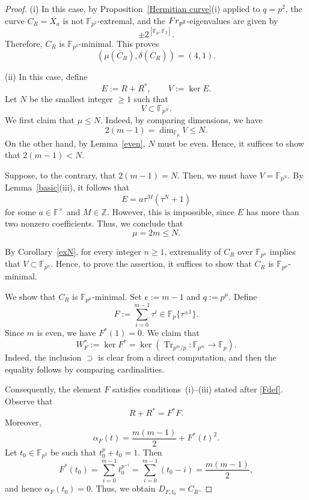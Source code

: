 \documentclass[10pt,a4paper]{amsart}
\def\F{{\mathbb F}}
\DeclareMathOperator{\Tr}{Tr}
\def\Z{{\mathbb Z}}
\begin{document}
\begin{proof}
(i) In this case, by Proposition~\ref{Hermitian curve}(i) applied to $q=p^2$, the curve $C_R=X_a$ is not $\F_{p^2}$-extremal, and the ${\rm Fr}_{p^2}$-eigenvalues are given by 
\[
\pm 2^{[\F_{p}:\F_2]}. 
\]
Therefore, $C_R$ is $\F_{p^4}$-minimal. This proves 
\[
(\mu(\overline{C}_R),\delta(\overline{C}_R))=(4,1). 
\]

\medskip

\noindent
(ii) In this case, define 
\[
E:=R+R^\ast,\qquad V:=\ker E. 
\]
Let $N$ be the smallest integer $\geq1$ such that 
\[
V\subset \F_{p^N}. 
\]
We first claim that $\mu\leq N$. Indeed, by comparing dimensions, we have 
\[
2(m-1)=\dim_{\F_p}
V\leq N.\]
On the other hand, by Lemma~\ref{even}, $N$ must be even. Hence, it suffices to show that $2(m-1)<N$. 

Suppose, to the contrary, that $2(m-1)=N$. Then, we must have $V=\F_{p^N}$. By Lemma~\ref{basic}(iii), it follows that 
\[
E=a\tau^M(\tau^N+1)
\]
for some $a\in \F^\times$ and $M\in\Z$. However, this is impossible, since $E$ has more than two nonzero coefficients. 
Thus, we conclude that 
\[\mu=2m\leq N. \]

By Corollary~\ref{exN}, for every integer $n\geq1$, extremality of $C_R$ over $\F_{p^n}$ implies that $V\subset \F_{p^n}$. Hence, to prove the assertion, it suffices to show that $C_R$ is $\F_{p^\mu}$-minimal. 

\medskip 

We show that $C_R$ is $\F_{p^\mu}$-minimal. Set $e:=m-1$ and $q:=p^\mu$. Define 
    \[
    F:=\sum_{i=0}^{m-1}\tau^i\in\F_p\{\tau^{\pm1}\}. 
    \]
    Since $m$ is even, we have $F^\ast(1)=0$. We claim that 
    \begin{equation}\label{WF=kerTr}
        W_F^\ast:=\ker F^\ast=\ker(\Tr_{p^m/p}\colon \F_{p^m}\to \F_p).
    \end{equation}
Indeed, the inclusion $\supset$ is clear from a direct computation, and then the equality follows by comparing cardinalities. 

Consequently, the element $F$ satisfies conditions~\textup{(i)--(iii)} stated after \eqref{Fdef}. Observe that 
    \[
    R+R^\ast=F^\ast F. 
    \]
Moreover, 
\[
\alpha_F(t)=\frac{m(m-1)}{2}+F^\ast(t)^2. 
\]
    Let $t_0\in\F_{p^2}$ be such that $t_0^{p}+t_0=1$. Then 
    \[
    F^\ast(t_0)=\sum_{i=0}^{m-1}t_0^{p^{-i}}=\sum_{i=0}^{m-1}(t_0-i)=\frac{m(m-1)}{2}, 
    \]
    and hence $\alpha_F(t_0)=0$. Thus, we obtain $D_{F,t_0}=C_R$. 


\end{proof}
\end{document}
